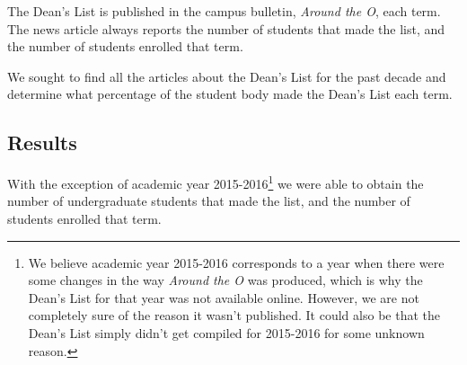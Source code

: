 \documentclass[10]{article}
\begin{document}
The Dean's List is published in the campus bulletin, \textit{Around the O}, each term. The news article always reports the number of students that made the list, and the number of students enrolled that term.

We sought to find all the articles about the Dean's List for the past decade and determine what percentage of the student body made the Dean's List each term.


\subsection{Results}

With the exception of academic year 2015-2016\footnote{We believe academic year 2015-2016 corresponds to a year when there were some changes in the way \textit{Around the O} was produced, which is why the Dean's List for that year was not available online. However, we are not completely sure of the reason it wasn't published. It could also be that the Dean's List simply didn't get compiled for 2015-2016 for some unknown reason.} we were able to obtain the number of undergraduate students that made the list, and the number of students enrolled that term.
\end{document}
